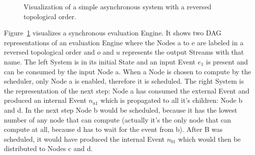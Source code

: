 \begin{figure}
  \caption{Visualization of a simple asynchronous system with a reversed topological order.}
\label{fig:chap3:sec_sync:visual_dag}
\end{figure}

Figure~\ref{fig:chap3:sec_sync:visual_dag} visualizes a synchronous evaluation Engine.
It shows two DAG representations of an evaluation Engine  where the Nodes a to e are labeled in a reversed topological order and \(o\) and \(u\) represents the output Streams with that name.
The left System is in its initial State and an input Event \(e_1\) is present and can be consumed by the input Node a.
When a Node is chosen to compute by the scheduler, only Node a is enabled, therefore it is scheduled.
The right System is the representation of the next step: Node a has consumed the external Event and produced an internal Event \(n_{a1}\) which is propagated to all it's children: Node b and d.
In the next step Node b would be scheduled, because it has the lowest number of any node that can compute (actually it's the only node that can compute at all, because d has to wait for the event from b).
After B was scheduled, it would have produced the internal Event \(n_{b1}\) which would then be distributed to Nodes c and d.

